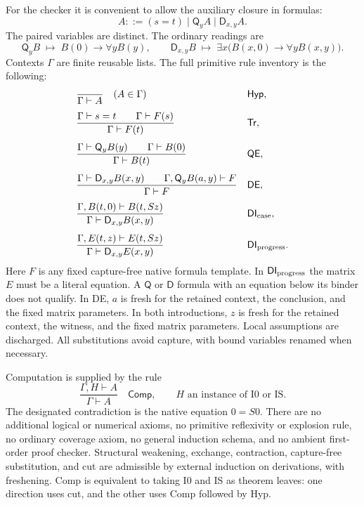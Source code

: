 \documentclass[11pt,letterpaper]{article}
\theoremstyle{definition}\newtheorem{definition}[theorem]{Definition}
\theoremstyle{remark}\newtheorem{remark}[theorem]{Remark}
\newcommand{\Q}{\mathsf Q}
\newcommand{\D}{\mathsf D}
\begin{document}
For the checker it is convenient to allow the auxiliary closure in formulas:
\[
             A::=(s=t)\mid \Q_y A\mid \D_{x,y}A.
\]
The paired variables are distinct. The ordinary readings are
\[
 \Q_y B\;\mapsto\;B(0)\to\forall y B(y),\qquad
 \D_{x,y}B\;\mapsto\;\exists x\bigl(B(x,0)\to\forall y B(x,y)\bigr).
\]
Contexts $\Gamma$ are finite reusable lists. The full primitive rule
inventory is the following:
\begin{align*}
 &\frac{}{\Gamma\vdash A}\quad(A\in\Gamma)
 &&\mathsf{Hyp},\\[4pt]
 &\frac{\Gamma\vdash s=t\qquad\Gamma\vdash F(s)}
        {\Gamma\vdash F(t)}
 &&\mathsf{Tr},\\[4pt]
 &\frac{\Gamma\vdash\Q_y B(y)\qquad\Gamma\vdash B(0)}
        {\Gamma\vdash B(t)}
 &&\mathsf{QE},\\[4pt]
 &\frac{\Gamma\vdash\D_{x,y}B(x,y)\qquad
         \Gamma,\Q_yB(a,y)\vdash F}
        {\Gamma\vdash F}
 &&\mathsf{DE},\\[4pt]
 &\frac{\Gamma,B(t,0)\vdash B(t,Sz)}
        {\Gamma\vdash\D_{x,y}B(x,y)}
 &&\mathsf{DI}_{\rm case},\\[4pt]
 &\frac{\Gamma,E(t,z)\vdash E(t,Sz)}
        {\Gamma\vdash\D_{x,y}E(x,y)}
 &&\mathsf{DI}_{\rm progress}.
\end{align*}
Here $F$ is any fixed capture-free native formula template. In
$\mathsf{DI}_{\rm progress}$ the matrix $E$ must be a literal
equation. A $\Q$ or $\D$ formula with an equation below its binder
does not qualify. In DE, $a$ is fresh for the retained context, the
conclusion, and the fixed matrix parameters. In both introductions,
$z$ is fresh for the retained context, the witness, and the fixed
matrix parameters. Local assumptions are discharged. All substitutions
avoid capture, with bound variables renamed when necessary.

Computation is supplied by the rule
\[
 \frac{\Gamma,H\vdash A}{\Gamma\vdash A}\quad\mathsf{Comp},
 \qquad H\text{ an instance of I0 or IS}.
\]
The designated contradiction is the native equation $0=S0$.
There are no additional logical or numerical axioms, no primitive
reflexivity or explosion rule, no ordinary coverage axiom, no general
induction schema, and no ambient first-order proof checker. Structural
weakening, exchange, contraction, capture-free substitution, and cut
are admissible by external induction on derivations, with freshening.
Comp is equivalent to taking I0 and IS as theorem leaves: one direction
uses cut, and the other uses Comp followed by Hyp.
\end{document}
